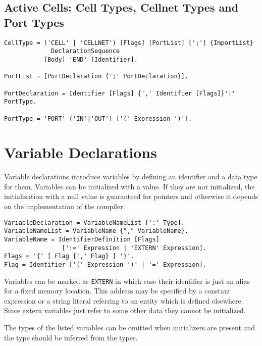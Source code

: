 \documentclass[a4wide,11pt]{article}
\begin{document}
\subsection{Active Cells: Cell Types, Cellnet Types and Port Types}

\begin{lstlisting}[style=ebnf]
CellType = ('CELL' | 'CELLNET') [Flags] [PortList] [';'] {ImportList}
             DeclarationSequence
           [Body] 'END' [Identifier].

PortList = [PortDeclaration {';' PortDeclaration}].

PortDeclaration = Identifier [Flags] {',' Identifier [Flags]}':' PortType.

PortType = 'PORT' ('IN'|'OUT') ['(' Expression ')'].

\end{lstlisting}

\section{Variable Declarations}

Variable declarations introduce variables by defining an identifier and a data type for them.
Variables can be initialized with a value.
If they are not initialized, the initialization with a null value is guaranteed for pointers and otherwise it depends on the implementation of the compiler.

\begin{lstlisting}[style=ebnf]
VariableDeclaration = VariableNameList [':' Type].
VariableNameList = VariableName {"," VariableName}.
VariableName = IdentifierDefinition [Flags]
                [':=' Expression | 'EXTERN' Expression].
Flags = '{' [ Flag {',' Flag} ] '}'.
Flag = Identifier ['(' Expression ')' | '=' Expression].
\end{lstlisting}

Variables can be marked as \lstinline"EXTERN" in which case their identifier is just an alias for a fixed memory location.
This address may be specified by a constant expression or a string literal referring to an entity which is defined elsewhere.
Since extern variables just refer to some other data they cannot be initialized.

The types of the listed variables can be omitted when initializers are present and the type should be inferred from the types.
\end{document}

